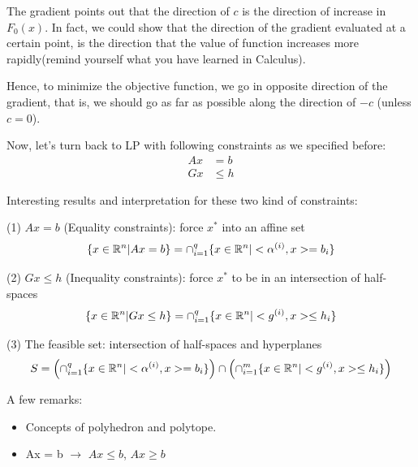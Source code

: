 The gradient points out that the direction of $c$ is the direction of increase in $F_0(x)$. In fact, we could show that the direction of the gradient evaluated at a certain point, is the direction that the value of function increases more rapidly(remind yourself what you have learned in Calculus).

Hence, to minimize the objective function, we go in opposite direction of the gradient, that is, we should go as far as possible along the direction of $-c$ (unless $c=0$).


\vspace{0.5cm}
Now, let's turn back to LP with following constraints as we specified before:
\begin{align*}
	Ax &= b\\
	Gx &\leq h
\end{align*}

Interesting results and interpretation for these two kind of constraints:

(1) $Ax=b$ (Equality constraints): force $x^*$ into an affine set
$$\{x\in \mathbb{R}^n|Ax = b \} =  \cap^q_{i=1}\{x\in \mathbb{R}^n|<\alpha^{(i)}, x> = b_i \}$$

(2) $Gx\leq h$ (Inequality constraints): force $x^*$ to be in an intersection of half-spaces
$$\{x\in \mathbb{R}^n|Gx \leq h \} =  \cap^q_{i=1}\{x\in \mathbb{R}^n| <g^{(i)}, x> \leq h_i \}$$

(3) The feasible set: intersection of half-spaces and hyperplanes
$$
S = \left(\cap^q_{i=1}\{x\in \mathbb{R}^n | <\alpha^{(i)}, x> = b_i \}\right) \cap \left(\cap^m_{i=1}\{x\in \mathbb{R}^n | <g^{(i)}, x> \leq h_i \}\right)
$$


A few remarks:
\begin{itemize}
	\item Concepts of polyhedron and polytope.
	
	\item Ax = b $\rightarrow$ $Ax \leq b$, $Ax \geq b$
\end{itemize}



